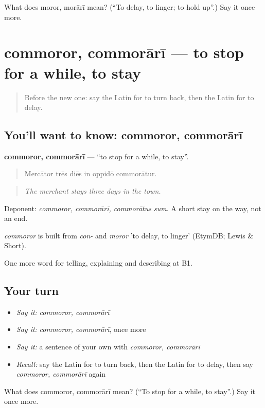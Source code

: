 \begin{tcolorbox}[breakable,colback=teal!4,colframe=teal!35!black,title={Before you move on}]
What does moror, morārī mean? (\textquotedblleft{}To delay, to linger; to hold up\textquotedblright{}.) Say it once more.
\end{tcolorbox}
\section[commoror, commorārī]{commoror, commorārī — to stop for a while, to stay}

\label{lesson:LA-C455-commoror}



\begin{quote}
Before the new one: say the Latin for to turn back, then the Latin for to delay.
\end{quote}

\subsection*{You'll want to know: commoror, commorārī}
\textbf{commoror, commorārī} — \textquotedblleft{}to stop for a while, to stay\textquotedblright{}.

\begin{quote}
Mercātor trēs diēs in oppidō commorātur.
\end{quote}

\begin{quote}
\emph{The merchant stays three days in the town.}
\end{quote}

Deponent: \emph{commoror, commorārī, commorātus sum}. A short stay on the way, not an end.

\begin{cousinweb}
\emph{commoror} is built from \emph{con-} and \emph{moror} 'to delay, to linger' (EtymDB; Lewis \& Short).
\end{cousinweb}

\begin{grammarlens}[title={What you've built}]
One more word for telling, explaining and describing at B1.
\end{grammarlens}

\subsection*{Your turn}
\begin{itemize}
\raggedright
  \item \emph{Say it:} \emph{commoror, commorārī}
  \item \emph{Say it:} \emph{commoror, commorārī}, once more
  \item \emph{Say it:} a sentence of your own with \emph{commoror, commorārī}
  \item \emph{Recall:} say the Latin for to turn back, then the Latin for to delay, then say \emph{commoror, commorārī} again
\end{itemize}

\begin{tcolorbox}[breakable,colback=teal!4,colframe=teal!35!black,title={Before you move on}]
What does commoror, commorārī mean? (\textquotedblleft{}To stop for a while, to stay\textquotedblright{}.) Say it once more.
\end{tcolorbox}
